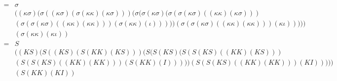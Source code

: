 \begin{align}
    =&\sigma  \tag*{} \\
    &((\kappa \sigma) (\sigma ((\kappa \sigma) (\sigma (\kappa \kappa) (\kappa \sigma))) (\sigma (\sigma (\kappa \sigma) (\sigma (\sigma (\kappa \sigma) ((\kappa \kappa) (\kappa \sigma))) \tag*{} \\
    &(\sigma (\sigma (\kappa \sigma) ((\kappa \kappa) (\kappa \kappa))) (\sigma (\kappa \kappa) (\iota))))) (\sigma (\sigma (\kappa \sigma) ((\kappa \kappa) (\kappa \kappa))) (\kappa \iota))))) \tag*{} \\
    &(\sigma (\kappa \kappa) (\kappa \iota)) \tag*{} \\
    =&S  \tag*{} \\
    &((K S) (S ((K S) (S (K K) (K S))) (S (S (K S) (S (S (K S) ((K K) (K S))) \tag*{} \\
    &(S (S (K S) ((K K) (K K))) (S (K K) (I))))) (S (S (K S) ((K K) (K K))) (K I))))) \tag*{} \\
    &(S (K K) (K I)) \tag*{} \\
\end{align}
